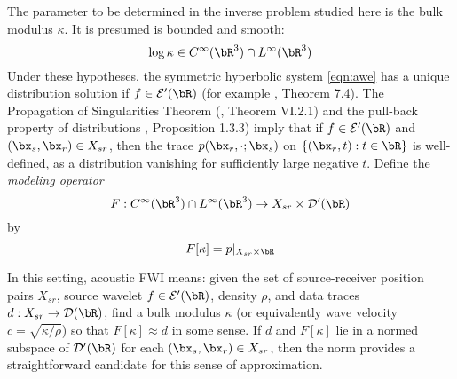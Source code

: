 The parameter to be determined in the inverse problem studied here is
the bulk modulus $\kappa$. It is presumed is bounded and smooth:
\begin{equation}
  \label{eqn:coeff}
  \log \kappa \in C^{\infty}(\bR^3) \cap L^{\infty}(\bR^3)
\end{equation}
Under these hypotheses, the symmetric hyperbolic system \ref{eqn:awe}
has a unique distribution
solution if $f \in \cal{E}'(\bR)$ (for example \cite{Lax:PDENotes},
Theorem 7.4). The Propagation of
Singularities Theorem (\cite{Tay:81}, Theorem VI.2.1) and
the pull-back property of distributions \cite{Dui:95}, Proposition 1.3.3)
imply that if $f \in \cal{E}'(\bR)$ and $(\bx_s,\bx_r) \in X_{sr}$,
then the trace $p(\bx_r, \cdot;\bx_s)$ on $\{(\bx_r,t): t \in \bR\}$ is well-defined,
as a distribution vanishing for sufficiently large
negative $t$. Define the {\em modeling operator}
\begin{equation}
  \label{eqn:modop}
  F: C^{\infty}(\bR^3) \cap L^{\infty}(\bR^3)
  \rightarrow X_{sr} \times {\cal D}'(\bR)
\end{equation}
by
\begin{equation}
  \label{eqn:modopdef}
  F[\kappa]= p|_{X_{sr} \times \bR}
\end{equation}

In this setting, acoustic FWI means: given the set of
source-receiver position pairs $X_{sr}$, source wavelet
$f \in {\cal E}'(\bR)$,  density $\rho$, and data traces
$d:  X_{sr} \rightarrow \cal{D}(\bR)$, find a bulk modulus $\kappa$
(or equivalently wave velocity $c=\sqrt{\kappa/\rho}$)
so that $F[\kappa] \approx d$ in some sense. If
$d$ and $F[\kappa]$ lie in a normed subspace of ${\cal D}'(\bR)$ for each
$(\bx_s,\bx_r) \in X_{sr}$, then the
norm provides a straightforward candidate for this sense of
approximation.


